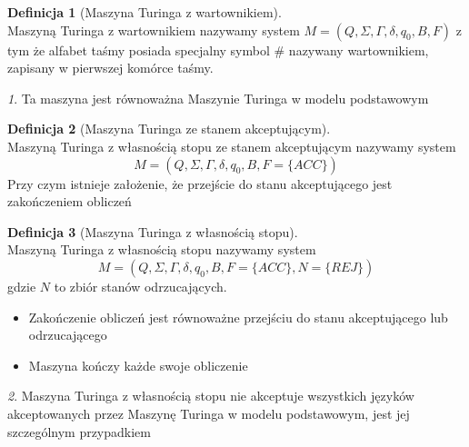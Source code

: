 \documentclass{beamer}
\theoremstyle{definition}
\newtheorem{df}{Definicja}
\theoremstyle{remark}
\newtheorem{uwaga}{}
\begin{document}
\begin{frame}
\begin{df}[Maszyna Turinga z wartownikiem]~\\
Maszyną Turinga z wartownikiem nazywamy system $M = (Q, \Sigma, \Gamma, \delta, q_0, B, F)$
z tym że alfabet taśmy posiada specjalny symbol $\#$ nazywany wartownikiem, zapisany w pierwszej
komórce taśmy.
\end{df}
\begin{uwaga}
Ta maszyna jest równoważna Maszynie Turinga w modelu podstawowym
\end{uwaga}
\end{frame}

\begin{frame}
	\begin{df}[Maszyna Turinga ze stanem akceptującym]~\\
	Maszyną Turinga z własnością stopu ze stanem akceptującym nazywamy system
		\begin{equation}
			M = (Q, \Sigma, \Gamma, \delta, q_0, B, F = \{ACC\})
		\end{equation}
	Przy czym istnieje założenie, że przejście do stanu akceptującego jest zakończeniem obliczeń
	\end{df}
\end{frame}

\begin{frame}
\begin{df}[Maszyna Turinga z własnością stopu]~\\
Maszyną Turinga z własnością stopu nazywamy system
\begin{equation}
M = (Q, \Sigma, \Gamma, \delta, q_0, B, F = \{ACC\}, N = \{REJ\})
\end{equation}
gdzie $N$ to zbiór stanów odrzucających.
\begin{itemize}
\item Zakończenie obliczeń jest równoważne przejściu do stanu akceptującego lub odrzucającego
\item Maszyna kończy każde swoje obliczenie
\end{itemize}
\end{df}
\end{frame}

\begin{frame}
	\begin{uwaga}
	Maszyna Turinga z własnością stopu nie akceptuje wszystkich języków akceptowanych przez 
	Maszynę Turinga w modelu podstawowym, jest jej szczególnym przypadkiem
	\end{uwaga}
\end{frame}
\end{document}
